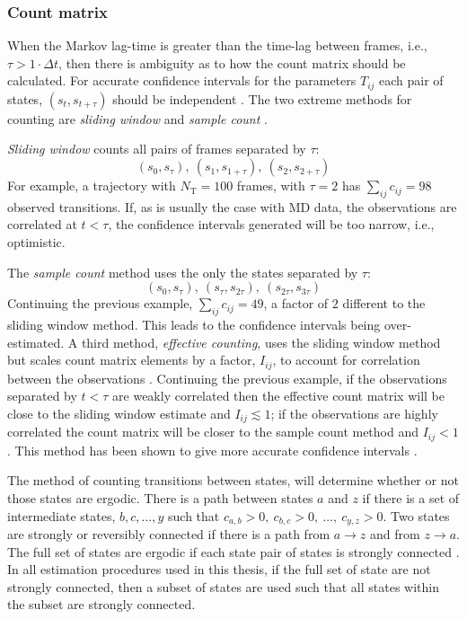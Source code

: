 \subsubsection{Count matrix}\label{sec:theory_count_mat}
When the Markov lag-time is greater than the time-lag between frames, i.e., $\tau > 1\cdot \Delta t$, then there is ambiguity as to how the count matrix should be calculated. For accurate confidence intervals for the parameters $T_{ij}$ each pair of states, $(s_{t}, s_{t+\tau})$ should be independent \cite{trendelkamp-schroerEstimationUncertaintyReversible2015b}. The two extreme methods for counting are \emph{sliding window} and \emph{sample count} \cite{trendelkamp-schroerEstimationUncertaintyReversible2015b}. 

\emph{Sliding window} counts all pairs of frames separated by $\tau$: 
\begin{equation*}
    (s_0, s_{\tau}),\ (s_1, s_{1+\tau}),\ (s_2, s_{2+\tau})
\end{equation*}
For example, a trajectory with $N_{\mathrm{T}}=100$ frames, with $\tau=2$ has $\sum_{ij}c_{ij}=98$ observed transitions. If, as is usually the case with MD data, the observations are correlated at $t < \tau$, the confidence intervals generated will be too narrow, i.e., optimistic. 

The \emph{sample count} method uses the only the states separated by $\tau$:
\begin{equation*}
    (s_{0}, s_{\tau}),\ (s_{\tau}, s_{2\tau}),\ (s_{2\tau}, s_{3\tau})
\end{equation*}
Continuing the previous example, $\sum_{ij}c_{ij}=49$, a factor of $2$ different to the sliding window method. This leads to the confidence intervals being over-estimated. A third method, \emph{effective counting}, uses the sliding window method but scales count matrix elements by a factor, $I_{ij}$, to account for correlation between the observations \cite{noeStatisticalInefficiencyMarkov,trendelkamp-schroerEstimationUncertaintyReversible2015b}. Continuing the previous example, if the observations separated by $t<\tau$ are weakly correlated then the effective count matrix will be close to the sliding window estimate and $I_{ij} \lesssim 1$; if the observations are highly correlated the count matrix will be closer to the sample count method and $I_{ij}<1$. This method has been shown to give more accurate confidence intervals \cite{trendelkamp-schroerEstimationUncertaintyReversible2015b}. 

The method of counting transitions between states, will determine whether or not those states are ergodic. There is a path between states $a$ and $z$ if there is a set of intermediate states, $b, c, \ldots, y$ such that $c_{a,b}>0,\ c_{b, c}>0,\ \ldots,\ c_{y, z}>0$. Two states are strongly or reversibly connected if there is a path from $a\rightarrow z$ and from $z\rightarrow a$. The full set of states are ergodic if each state pair of states is strongly connected \cite{wilson1996introduction}. In all estimation procedures used in this thesis, if the full set of state are not strongly connected, then a subset of states are used such that all states within the subset are strongly connected.

